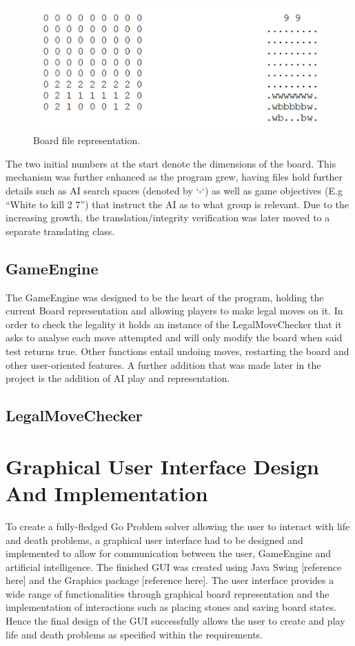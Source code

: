 \documentclass{l3proj}
\begin{document}
\begin{figure}[H]
\centering
\includegraphics[scale=1]{Images/GE-BoardSave.png}
\caption{Board file representation.}
\end{figure}

The two initial numbers at the start denote the dimensions of the board. This mechanism was further enhanced as the program grew, having files hold further details such as AI search spaces (denoted by ‘-‘) as well as game objectives (E.g “White to kill 2 7”) that instruct the AI as to what group is relevant. Due to the increasing growth, the translation/integrity verification was later moved to a separate translating class.

\subsection{GameEngine}

The GameEngine was designed to be the heart of the program, holding the current Board representation and allowing players to make legal moves on it. In order to check the legality it holds an instance of the LegalMoveChecker that it asks to analyse each move attempted and will only modify the board when said test returns true. Other functions entail undoing moves, restarting the board and other user-oriented features. A further addition that was made later in the project is the addition of AI play and representation. 

\subsection{LegalMoveChecker}

\section{Graphical User Interface Design And Implementation}

To create a fully-fledged Go Problem solver allowing the user to interact with life and death problems, a graphical user interface had to be designed and implemented to allow for communication between the user, GameEngine and artificial intelligence. The finished GUI was created using Java Swing [reference here] and the Graphics package [reference here]. The user interface provides a wide range of functionalities through graphical board representation and the implementation of interactions such as placing stones and saving board states. Hence the final design of the GUI successfully allows the user to create and play life and death problems as specified within the requirements.
\end{document}
